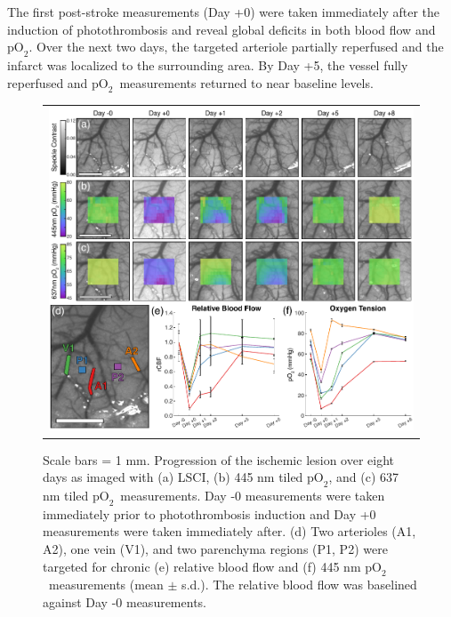 \documentclass[12pt]{spieman}  %
\newcommand{\pO}{\ensuremath{\text{pO}_2}} 	            %
\begin{document}
\begin{spacing}{2}
The first post-stroke measurements (Day +0) were taken immediately after the induction of photothrombosis and reveal global deficits in both blood flow and \pO. Over the next two days, the targeted arteriole partially reperfused and the infarct was localized to the surrounding area. By Day +5, the vessel fully reperfused and \pO\ measurements returned to near baseline levels.

\begin{figure}
    \begin{center}
        \begin{tabular}{c}
            \includegraphics[width=6.25in]{Figure6.pdf}
        \end{tabular}
    \end{center}
    \caption {
        \label{fig:chronic}
        Scale bars = 1 mm. Progression of the ischemic lesion over eight days as imaged with (a) LSCI, (b) 445 nm tiled \pO, and (c) 637 nm tiled \pO\ measurements. Day -0 measurements were taken immediately prior to photothrombosis induction and Day +0 measurements were taken immediately after. (d) Two arterioles (A1, A2), one vein (V1), and two parenchyma regions (P1, P2) were targeted for chronic (e) relative blood flow and (f) 445 nm \pO\ measurements (mean $\pm$ s.d.). The relative blood flow was baselined against Day -0 measurements.
    }
\end{figure}



\end{spacing}
\end{document}
